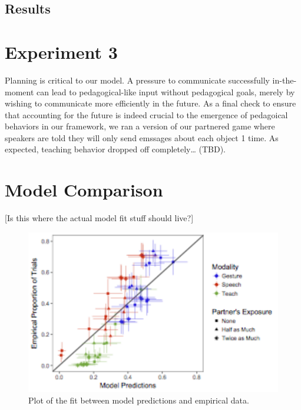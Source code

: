 \documentclass[10pt, letterpaper]{article}
\newenvironment{CodeChunk}{}{}
\begin{document}
\subsection{Results}\label{results-3}

\section{Experiment 3}\label{experiment-3}

Planning is critical to our model. A pressure to communicate
successfully in-the-moment can lead to pedagogical-like input without
pedagogical goals, merely by wishing to communicate more efficiently in
the future. As a final check to ensure that accounting for the future is
indeed crucial to the emergence of pedagoical behaviors in our
framework, we ran a version of our partnered game where speakers are
told they will only send emssages about each object 1 time. As expected,
teaching behavior dropped off completely\ldots{} (TBD).

\section{Model Comparison}\label{model-comparison}

{[}Is this where the actual model fit stuff should live?{]}

\begin{CodeChunk}
\begin{figure}[H]

{\centering \includegraphics{figs/image4-1} 

}

\caption[Plot of the fit between model predictions and empirical data]{Plot of the fit between model predictions and empirical data.}\label{fig:image4}
\end{figure}
\end{CodeChunk}
\end{document}
